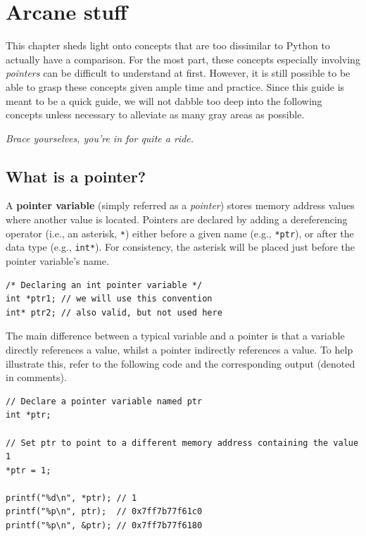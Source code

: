 \chapter{Arcane stuff}



This chapter sheds light onto concepts that are too dissimilar to Python to actually have a comparison.
For the most part, these concepts especially involving \textit{pointers} can be difficult to understand at first.
However, it is still possible to be able to grasp these concepts given ample time and practice.
Since this guide is meant to be a quick guide, we will not dabble too deep into the following concepts unless necessary to alleviate as many gray areas as possible.

\textit{Brace yourselves, you're in for quite a ride.}

\section{What is a pointer?}

A \textbf{pointer variable} (simply referred as a \textit{pointer}) stores memory address values where another value is located.
Pointers are declared by adding a dereferencing operator (i.e., an asterisk, \verb|*|) either before a given name (e.g., \verb|*ptr|), or after the data type (e.g., \verb|int*|).
For consistency, the asterisk will be placed just before the pointer variable's name.

\begin{verbatim}
/* Declaring an int pointer variable */
int *ptr1; // we will use this convention
int* ptr2; // also valid, but not used here
\end{verbatim}

The main difference between a typical variable and a pointer is that a variable directly references a value, whilst a pointer indirectly references a value.
To help illustrate this, refer to the following code and the corresponding output (denoted in comments).

\begin{verbatim}
// Declare a pointer variable named ptr
int *ptr;

// Set ptr to point to a different memory address containing the value 1
*ptr = 1;

printf("%d\n", *ptr); // 1
printf("%p\n", ptr);  // 0x7ff7b77f61c0
printf("%p\n", &ptr); // 0x7ff7b77f6180
\end{verbatim}

